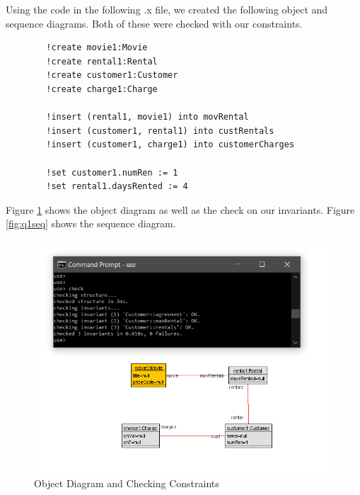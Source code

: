 \documentclass{article}
\begin{document}
	\noindent
	Using the code in the following .x file, we created the following object and sequence diagrams. Both of these were checked with our constraints.
	\begin{Verbatim}
		!create movie1:Movie
		!create rental1:Rental
		!create customer1:Customer
		!create charge1:Charge
		
		!insert (rental1, movie1) into movRental
		!insert (customer1, rental1) into custRentals
		!insert (customer1, charge1) into customerCharges
		
		!set customer1.numRen := 1
		!set rental1.daysRented := 4
	\end{Verbatim}
	\noindent
	Figure \ref{fig:q1obj} shows the object diagram as well as the check on our invariants. Figure \ref{fig:q1seq} shows the sequence diagram.
	\begin{figure}[h]
		\includegraphics[width=\linewidth]{Q1ObjPNG.PNG}
		\caption{Object Diagram and Checking Constraints}
		\label{fig:q1obj}
	\end{figure}
	\newpage
\end{document}
